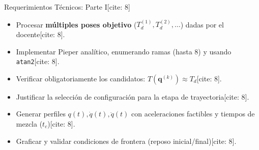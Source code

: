 \documentclass[aspectratio=169, xcolor={table,xcdraw}]{beamer}
\begin{document}
\begin{frame}{Requerimientos Técnicos: Parte I[cite: 8]}
    \begin{tcolorbox}[colback=white, colframe=ucbblue, title=\textbf{Cinemática Inversa y Selección} {(15\% + 10\% FK)[cite: 8]}, boxsep=0mm, top=1mm, bottom=1mm, left=1mm, right=1mm]
        \footnotesize
        \begin{itemize}
            \item Procesar \textbf{múltiples poses objetivo} ($T_d^{(1)}, T_d^{(2)}, \dots$) dadas por el docente[cite: 8].
            \item Implementar Pieper analítico, enumerando ramas (hasta 8) y usando \texttt{atan2}[cite: 8].
            \item Verificar obligatoriamente los candidatos: $T(\mathbf{q}^{(k)}) \approx T_d$[cite: 8].
            \item Justificar la selección de configuración para la etapa de trayectoria[cite: 8].
        \end{itemize}
    \end{tcolorbox}
    
    \vspace{0.2cm}
    \begin{tcolorbox}[colback=white, colframe=ucbblue, title=\textbf{Trayectoria LSPB} {(15\%)[cite: 8]}, boxsep=0mm, top=1mm, bottom=1mm, left=1mm, right=1mm]
        \footnotesize
        \begin{itemize}
            \item Generar perfiles $q(t), \dot{q}(t), \ddot{q}(t)$ con aceleraciones factibles y tiempos de mezcla ($t_c$)[cite: 8].
            \item Graficar y validar condiciones de frontera (reposo inicial/final)[cite: 8].
        \end{itemize}
    \end{tcolorbox}
\end{frame}
\end{document}
